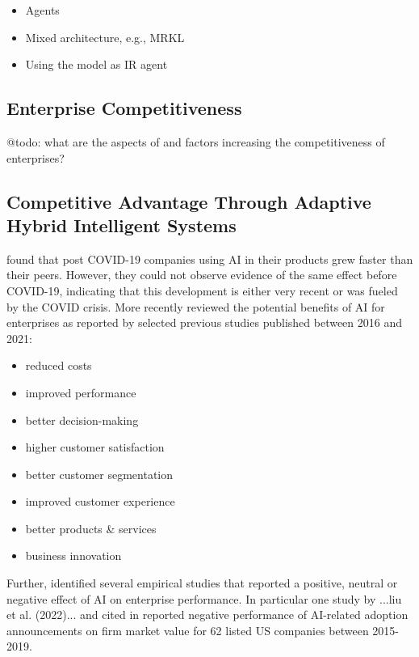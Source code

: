 \begin{itemize}
    \item Agents 
    \item Mixed architecture, e.g., MRKL
    \item Using the model as IR agent 
\end{itemize}





\subsection{Enterprise Competitiveness}

{\color{purple} @todo: what are the aspects of and factors increasing the competitiveness of enterprises?}


\subsection{Competitive Advantage Through Adaptive Hybrid Intelligent Systems}

\cite{xuCanArtificialIntelligence2021} found that post COVID-19 companies using AI in their products grew
faster than their peers. However, they could not observe evidence of the same effect before COVID-19, indicating
that this development is either very recent or was fueled by the COVID crisis. More recently
\cite{hoArtificialIntelligenceFirm2022} reviewed the potential benefits of AI for enterprises as reported
by selected previous studies published between 2016 and 2021:

\begin{itemize}
    \item reduced costs
    \item improved performance
    \item better decision-making
    \item higher customer satisfaction
    \item better customer segmentation
    \item improved customer experience
    \item better products \& services
    \item business innovation
\end{itemize}

Further, \cite{hoArtificialIntelligenceFirm2022} identified several empirical studies that reported a positive,
neutral or negative effect of AI on enterprise performance. In particular one study by ...liu et al. (2022)...
and cited in \cite{hoArtificialIntelligenceFirm2022} reported negative performance of AI-related adoption 
announcements on firm market value for 62 listed US companies between 2015-2019.
